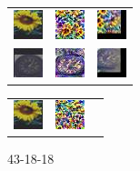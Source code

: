 \begin{figure}[h]
\begin{subtable}{.33\linewidth}
{\begin{tabular}{ l l l }
             \includegraphics[width = 24pt]{enhimages431818/ori_77.jpg} & \includegraphics[width = 24pt]{defimages431818/rec_77.jpg} &
             \includegraphics[width = 24pt]{enhimages431818/rec_77.jpg} \\
             \includegraphics[width = 24pt]{enhimages431818/ori_91.jpg} & \includegraphics[width = 24pt]{defimages431818/rec_91.jpg} &
             \includegraphics[width = 24pt]{enhimages431818/rec_91.jpg} \\
        \end{tabular}}
        \caption{43-18-18}%
    \end{subtable}%
    \begin{subtable}{.33\linewidth}
        \centering
        {\begin{tabular}{ l l l }
             \includegraphics[width = 24pt]{enhimagesHybrid/ori_77.jpg} & \includegraphics[width = 24pt]{defimagesHybrid/rec_77.jpg} &

\end{tabular}}
\end{subtable}
\end{figure}
